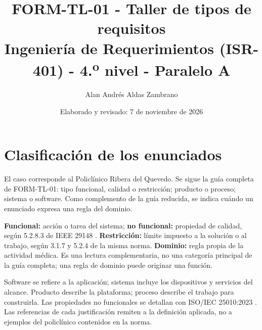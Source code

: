 \documentclass[11pt,a4paper]{article}
\title{FORM-TL-01 - Taller de tipos de requisitos\\
\large Ingeniería de Requerimientos (ISR-401) - 4.\textsuperscript{o} nivel - Paralelo A}
\author{Alan Andrés Aldas Zambrano}
\date{Elaborado y revisado: 7 de noviembre de 2026}
\begin{document}
\maketitle

\section{Clasificación de los enunciados}

El caso corresponde al Policlínico Ribera del Quevedo. Se sigue la guía completa de FORM-TL-01: tipo funcional, calidad o restricción; producto o proceso; sistema o software. Como complemento de la guía reducida, se indica cuándo un enunciado expresa una regla del dominio.

\textbf{Funcional:} acción o tarea del sistema; \textbf{no funcional:} propiedad de calidad, según 5.2.8.3 de IEEE 29148 \cite{iso29148}. \textbf{Restricción:} límite impuesto a la solución o al trabajo, según 3.1.7 y 5.2.4 de la misma norma. \textbf{Dominio:} regla propia de la actividad médica. Es una lectura complementaria, no una categoría principal de la guía completa; una regla de dominio puede originar una función.

Software se refiere a la aplicación; sistema incluye los dispositivos y servicios del alcance. Producto describe la plataforma; proceso describe el trabajo para construirla. Las propiedades no funcionales se detallan con ISO/IEC 25010:2023 \cite{iso25010}. Las referencias de cada justificación remiten a la definición aplicada, no a ejemplos del policlínico contenidos en la norma.

\end{document}
